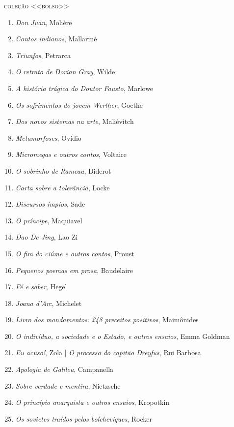 \pagebreak
\blankAteven

\pagestyle{empty}

\begingroup
\fontsize{7}{8}\selectfont
{\large\textsc{coleção <<bolso>>}}\\
\begin{enumerate}
\setlength\parskip{4.2pt}
\setlength\itemsep{-1.4mm}
\item \textit{Don Juan}, Molière
\item \textit{Contos indianos}, Mallarmé
\item \textit{Triunfos}, Petrarca
\item \textit{O retrato de Dorian Gray}, Wilde
\item \textit{A história trágica do Doutor Fausto}, Marlowe
\item \textit{Os sofrimentos do jovem Werther}, Goethe
\item \textit{Dos novos sistemas na arte}, Maliévitch
\item \textit{Metamorfoses}, Ovídio
\item \textit{Micromegas e outros contos}, Voltaire
\item \textit{O sobrinho de Rameau}, Diderot
\item \textit{Carta sobre a tolerância}, Locke
\item \textit{Discursos ímpios}, Sade
\item \textit{O príncipe}, Maquiavel
\item \textit{Dao De Jing}, Lao Zi
\item \textit{O fim do ciúme e outros contos}, Proust
\item \textit{Pequenos poemas em prosa}, Baudelaire
\item \textit{Fé e saber}, Hegel
\item \textit{Joana d'Arc}, Michelet
\item \textit{Livro dos mandamentos: 248 preceitos positivos}, Maimônides
\item \textit{O indivíduo, a sociedade e o Estado, e outros ensaios}, Emma Goldman
\item \textit{Eu acuso!}, Zola | \textit{O processo do capitão Dreyfus}, Rui Barbosa
\item \textit{Apologia de Galileu}, Campanella 
\item \textit{Sobre verdade e mentira}, Nietzsche
\item \textit{O princípio anarquista e outros ensaios}, Kropotkin
\item \textit{Os sovietes traídos pelos bolcheviques}, Rocker

\end{enumerate}
